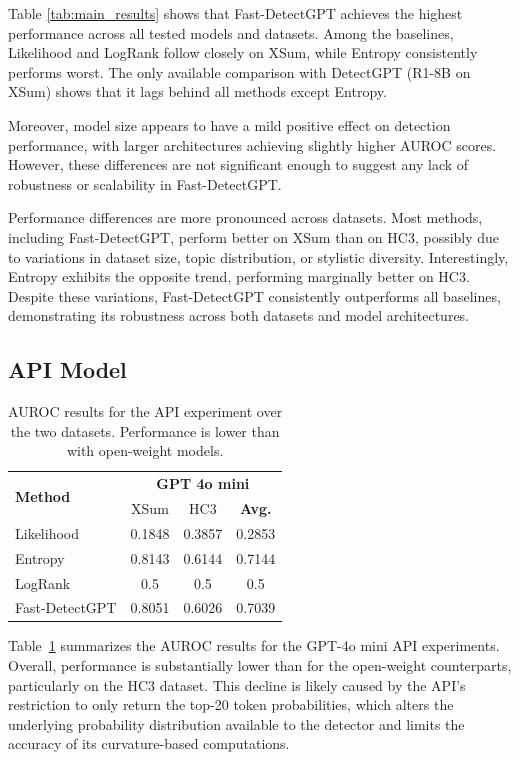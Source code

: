 \documentclass[11pt]{article}
\begin{document}
Table \ref{tab:main_results} shows that Fast-DetectGPT achieves the highest performance across all tested models and datasets. Among the baselines, Likelihood and LogRank follow closely on XSum, while Entropy consistently performs worst. The only available comparison with DetectGPT (R1-8B on XSum) shows that it lags behind all methods except Entropy.

Moreover, model size appears to have a mild positive effect on detection performance, with larger architectures achieving slightly higher AUROC scores. However, these differences are not significant enough to suggest any lack of robustness or scalability in Fast-DetectGPT.

Performance differences are more pronounced across datasets. Most methods, including Fast-DetectGPT, perform better on XSum than on HC3, possibly due to variations in dataset size, topic distribution, or stylistic diversity. Interestingly, Entropy exhibits the opposite trend, performing marginally better on HC3. Despite these variations, Fast-DetectGPT consistently outperforms all baselines, demonstrating its robustness across both datasets and model architectures.

\subsection{API Model}

\begin{table}[h]
    \centering
    \small
    \begin{tabular}{l|cc|c}
    \toprule
    \multirow{2}{*}{\textbf{Method}} & \multicolumn{3}{c}{\textbf{GPT 4o mini}} \\
    \cmidrule{2-4}
    & XSum & HC3 & \textbf{Avg.} \\
    \midrule
    Likelihood & 0.1848 & 0.3857 & 0.2853 \\
    Entropy & 0.8143 & 0.6144 & 0.7144 \\
    LogRank & 0.5 & 0.5 & 0.5 \\
    \midrule
    Fast-DetectGPT & 0.8051 & 0.6026 & 0.7039 \\
    \bottomrule
    \end{tabular}
    \vspace{0.5em}
    \caption{AUROC results for the API experiment over the two datasets. Performance is lower than with open-weight models.}
    \label{tab:API_results}
\end{table} 

Table~\ref{tab:API_results} summarizes the AUROC results for the GPT-4o mini API experiments. Overall, performance is substantially lower than for the open-weight counterparts, particularly on the HC3 dataset. This decline is likely caused by the API’s restriction to only return the top-20 token probabilities, which alters the underlying probability distribution available to the detector and limits the accuracy of its curvature-based computations.
\end{document}
